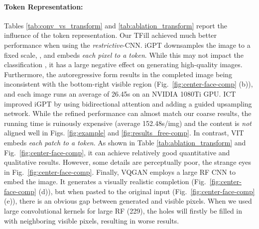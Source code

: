 \documentclass[10pt,twocolumn,letterpaper]{article}
\begin{document}
\vspace{-0.2cm}\paragraph{Token Representation:} Tables \ref{tab:conv_vs_transform} and \ref{tab:ablation_transform} report the influence of the token representation. Our TFill achieved much better performance when using the \emph{restrictive}-CNN. iGPT \cite{chen2020generative} downsamples the image to a fixed scale, \eg , and embeds \emph{each pixel to a token}. While this may not impact the classification \cite{torralba200880}, it has a large negative effect on generating high-quality images. Furthermore, the autoregressive form results in the completed image being inconsistent with the bottom-right visible region (Fig.~\ref{fig:center-face-comp} (b)), and each image runs an average of 26.45s on an NVIDIA 1080Ti GPU. ICT \cite{Wan_2021_ICCV} improved iGPT by using bidirectional attention and adding a guided upsampling network. While the refined performance can almost match our coarse results, the running time is ruinously expensive (average 152.48s/img) and the content is \emph{not} aligned well in Figs. \ref{fig:example} and \ref{fig:results_free-comp}. In contrast, VIT \cite{dosovitskiy2020image} embeds \emph{each patch to a token}. As shown in Table \ref{tab:ablation_transform} and Fig.~\ref{fig:center-face-comp}, it can achieve relatively good quantitative and qualitative results. However, some details are perceptually poor, \eg the strange eyes in Fig.~\ref{fig:center-face-comp}. Finally, VQGAN \cite{esser2020taming} employs a large RF CNN to embed the image. It generates a visually realistic completion (Fig.\ \ref{fig:center-face-comp} (d)), but when pasted to the original input (Fig.\ \ref{fig:center-face-comp} (e)), there is an obvious gap between generated and visible pixels. When we used large convolutional kernels for large RF (229), the holes will firstly be filled in with neighboring visible pixels, resulting in worse results.
\end{document}
